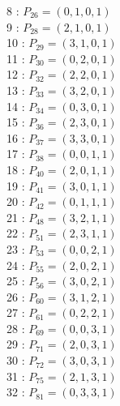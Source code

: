 \documentclass{article}
\begin{document}
{\begin{multicols}{3}
8 : $P_{26}=( 0, 1, 0, 1 )$\\
9 : $P_{28}=( 2, 1, 0, 1 )$\\
10 : $P_{29}=( 3, 1, 0, 1 )$\\
11 : $P_{30}=( 0, 2, 0, 1 )$\\
12 : $P_{32}=( 2, 2, 0, 1 )$\\
13 : $P_{33}=( 3, 2, 0, 1 )$\\
14 : $P_{34}=( 0, 3, 0, 1 )$\\
15 : $P_{36}=( 2, 3, 0, 1 )$\\
16 : $P_{37}=( 3, 3, 0, 1 )$\\
17 : $P_{38}=( 0, 0, 1, 1 )$\\
18 : $P_{40}=( 2, 0, 1, 1 )$\\
19 : $P_{41}=( 3, 0, 1, 1 )$\\
20 : $P_{42}=( 0, 1, 1, 1 )$\\
21 : $P_{48}=( 3, 2, 1, 1 )$\\
22 : $P_{51}=( 2, 3, 1, 1 )$\\
23 : $P_{53}=( 0, 0, 2, 1 )$\\
24 : $P_{55}=( 2, 0, 2, 1 )$\\
25 : $P_{56}=( 3, 0, 2, 1 )$\\
26 : $P_{60}=( 3, 1, 2, 1 )$\\
27 : $P_{61}=( 0, 2, 2, 1 )$\\
28 : $P_{69}=( 0, 0, 3, 1 )$\\
29 : $P_{71}=( 2, 0, 3, 1 )$\\
30 : $P_{72}=( 3, 0, 3, 1 )$\\
31 : $P_{75}=( 2, 1, 3, 1 )$\\
32 : $P_{81}=( 0, 3, 3, 1 )$\\
\end{multicols}


%


%


}%
\end{document}
